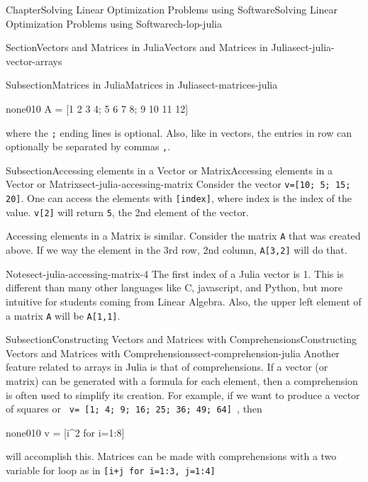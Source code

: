 \documentclass[oneside,10pt,]{book}
\newcommand{\mono}[1]{\texttt{#1}}
\numberwithin{equation}{section}
\begin{document}
\begin{chapterptx}{Chapter}{Solving Linear Optimization Problems using Software}{}{Solving Linear Optimization Problems using Software}{}{}{ch-lop-julia}
\begin{sectionptx}{Section}{Vectors and Matrices in Julia}{}{Vectors and Matrices in Julia}{}{}{sect-julia-vector-arrays}
\begin{subsectionptx}{Subsection}{Matrices in Julia}{}{Matrices in Julia}{}{}{sect-matrices-julia}
\begin{program}{none}{0}{1}{0}
A = [1 2 3 4;
     5 6 7 8;
     9 10 11 12]
\end{program}
where the \mono{;} ending lines is optional. Also, like in vectors, the entries in row can optionally be separated by commas \mono{,}.%
\end{subsectionptx}
%
%
\typeout{************************************************}
\typeout{************************************************}
%
\begin{subsectionptx}{Subsection}{Accessing elements in a Vector or Matrix}{}{Accessing elements in a Vector or Matrix}{}{}{sect-julia-accessing-matrix}
Consider the vector \mono{v=[10; 5; 15; 20]}. One can access the elements with \mono{[index]}, where index is the index of the value. \mono{v[2]} will return \mono{5}, the 2nd element of the vector.%
\par
Accessing elements in a Matrix is similar. Consider the matrix \mono{A} that was created above. If we way the element in the 3rd row, 2nd column, \mono{A[3,2]} will do that.%
\begin{note}{Note}{}{sect-julia-accessing-matrix-4}%
The first index of a Julia vector is 1. This is different than many other languages like C, javascript, and Python, but more intuitive for students coming from Linear Algebra. Also, the upper left element of a matrix \mono{A} will be \mono{A[1,1]}.%
\end{note}
\end{subsectionptx}
%
%
\typeout{************************************************}
\typeout{************************************************}
%
\begin{subsectionptx}{Subsection}{Constructing Vectors and Matrices with Comprehensions}{}{Constructing Vectors and Matrices with Comprehensions}{}{}{sect-comprehension-julia}
Another feature related to arrays in Julia is that of comprehensions. If a vector (or matrix) can be generated with a formula for each element, then a comprehension is often used to simplify its creation. For example, if we want to produce a vector of squares or \mono{ v= [1; 4; 9; 16; 25; 36; 49; 64] }, then%
\begin{program}{none}{0}{1}{0}
v = [i^2 for i=1:8]
\end{program}
will accomplish this. Matrices can be made with comprehensions with a two variable for loop as in \mono{[i+j for i=1:3, j=1:4]}%
\par

\end{subsectionptx}
\end{sectionptx}
\end{chapterptx}
\end{document}
